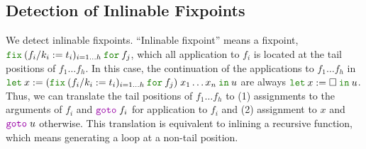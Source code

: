 \documentclass[a4paper,fleqn]{article}
\newcommand{\kwlet}{\mbox{\color{mygreen}\ttfamily let}}
\newcommand{\kwin}{\mbox{\color{mygreen}\ttfamily in}}
\newcommand{\kwfix}{\mbox{\color{mygreen}\ttfamily fix}}
\newcommand{\kwfor}{\mbox{\color{mygreen}\ttfamily for}}
\newcommand{\letin}[3]{\kwlet\:#1:=#2\:\kwin\:#3}
\newcommand{\fix}[4]{\kwfix\:(#1 := #2)_{#3}\:\kwfor\:#4}
\newcommand{\kwgoto}{\mbox{\color{myviolet}\ttfamily goto}}
\begin{document}
\subsection{Detection of Inlinable Fixpoints}\label{sec:inlinable-fixpoint-detection}
We detect inlinable fixpoints.
``Inlinable fixpoint'' means a fixpoint, $\fix{f_i/k_i}{t_i}{i=1\ldots h}{f_j}$,
which all application to $f_i$ is located at the tail positions of $f_1\ldots f_h$.
In this case, the continuation of the applications to $f_1\ldots f_h$
in $\letin{x}{(\fix{f_i/k_i}{t_i}{i=1\ldots h}{f_j})\;x_1\ldots x_n}{u}$
are always $\letin{x}{\Box}{u}$.
Thus, we can translate the tail positions of $f_1\ldots f_h$ to
(1) assignments to the arguments of $f_i$ and $\kwgoto{}\;f_i$ for application to $f_i$ and
(2) assignment to $x$ and $\kwgoto{}\;u$ otherwise.
This translation is equivalent to inlining a recursive function, which means generating a loop at a non-tail position.
\end{document}
